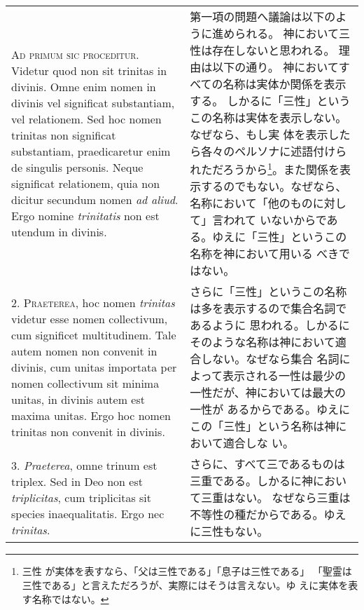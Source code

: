 \documentclass[10pt]{jsarticle} %
\begin{document}
\begin{longtable}{p{21em}p{21em}}

{\scshape Ad primum sic proceditur}. Videtur quod non sit trinitas in
divinis. Omne enim nomen in divinis vel significat substantiam, vel
relationem. Sed hoc nomen trinitas non significat substantiam,
praedicaretur enim de singulis personis. Neque significat relationem,
quia non dicitur secundum nomen {\itshape ad aliud}. Ergo nomine {\itshape trinitatis} non
est utendum in divinis.


&

第一項の問題へ議論は以下のように進められる。
神において三性は存在しないと思われる。
理由は以下の通り。
神においてすべての名称は実体か関係を表示する。
しかるに「三性」というこの名称は実体を表示しない。なぜなら、もし実
 体を表示したら各々のペルソナに述語付けられただろうから\footnote{三性
が実体を表すなら、「父は三性である」「息子は三性である」
 「聖霊は三性である」と言えただろうが、実際にはそうは言えない。ゆ
 えに実体を表す名称ではない。}。また関係を表
 示するのでもない。なぜなら、名称において「他のものに対して」言われて
 いないからである。ゆえに「三性」というこの名称を神において用いる
 べきではない。


\\



2. {\scshape Praeterea}, hoc nomen {\itshape trinitas} videtur esse nomen collectivum, cum
significet multitudinem. Tale autem nomen non convenit in divinis, cum
unitas importata per nomen collectivum sit minima unitas, in divinis
autem est maxima unitas. Ergo hoc nomen trinitas non convenit in
divinis.


&

さらに「三性」というこの名称は多を表示するので集合名詞であるように
 思われる。しかるにそのような名称は神において適合しない。なぜなら集合
 名詞によって表示される一性は最少の一性だが、神においては最大の一性が
 あるからである。ゆえにこの「三性」という名称は神において適合しな
 い。

\\



3. {\itshape Praeterea}, omne trinum est triplex. Sed in Deo non est {\itshape triplicitas},
cum triplicitas sit species inaequalitatis. Ergo nec {\itshape trinitas}.


&

さらに、すべて三であるものは三重である。しかるに神において三重はない。
 なぜなら三重は不等性の種だからである。ゆえに三性もない。


\end{longtable}
\end{document}
